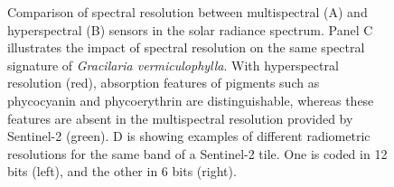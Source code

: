 \documentclass[
  letterpaper,
  11pt,
  english,
  singlespacing,
  headsepline]{MastersDoctoralThesis}
\begin{document}
\begin{spacing}{1.5}
\begin{figure}


\caption{\label{fig-Spectral_resolutions}Comparison of spectral
resolution between multispectral (A) and hyperspectral (B) sensors in
the solar radiance spectrum. Panel C illustrates the impact of spectral
resolution on the same spectral signature of \emph{Gracilaria
vermiculophylla}. With hyperspectral resolution (red), absorption
features of pigments such as phycocyanin and phycoerythrin are
distinguishable, whereas these features are absent in the multispectral
resolution provided by Sentinel-2 (green). D is showing examples of
different radiometric resolutions for the same band of a Sentinel-2
tile. One is coded in 12 bits (left), and the other in 6 bits (right).}

\end{figure}%


\end{spacing}
\end{document}
